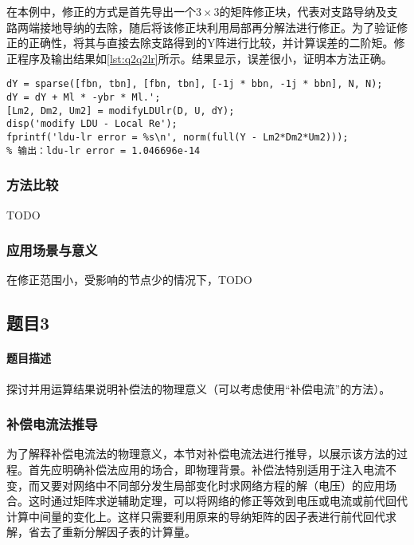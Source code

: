 \documentclass[a4paper,12pt]{article}
\begin{document}
    在本例中，修正的方式是首先导出一个$3\times 3$的矩阵修正块，代表对支路导纳及支路两端接地导纳的去除，随后将该修正块利用局部再分解法进行修正。为了验证修正的正确性，将其与直接去除支路得到的Y阵进行比较，并计算误差的二阶矩。修正程序及输出结果如\cref{lst:q2q2lr}所示。结果显示，误差很小，证明本方法正确。
    \begin{lstlisting}[style=Matlab-editor,basicstyle=\mlttfamily,label=lst:q2q2lr,caption={秩1因子修正法去除支路}]
%% Modify LDU - Local Re
dY = sparse([fbn, tbn], [fbn, tbn], [-1j * bbn, -1j * bbn], N, N);
dY = dY + Ml * -ybr * Ml.';
[Lm2, Dm2, Um2] = modifyLDUlr(D, U, dY);
disp('modify LDU - Local Re');
fprintf('ldu-lr error = %s\n', norm(full(Y - Lm2*Dm2*Um2)));
% 输出：ldu-lr error = 1.046696e-14
    \end{lstlisting}
    \subsubsection{方法比较}
    TODO
    \subsubsection{应用场景与意义}
    在修正范围小，受影响的节点少的情况下，TODO

    \subsection{题目3}
    \paragraph{题目描述} 探讨并用运算结果说明补偿法的物理意义（可以考虑使用“补偿电流”的方法）。
    \subsubsection{补偿电流法推导}
    为了解释补偿电流法的物理意义，本节对补偿电流法进行推导，以展示该方法的过程。首先应明确补偿法应用的场合，即物理背景。补偿法特别适用于注入电流不变，而又要对网络中不同部分发生局部变化时求网络方程的解（电压）的应用场合。这时通过矩阵求逆辅助定理，可以将网络的修正等效到电压或电流或前代回代计算中间量的变化上。这样只需要利用原来的导纳矩阵的因子表进行前代回代求解，省去了重新分解因子表的计算量。
\end{document}

